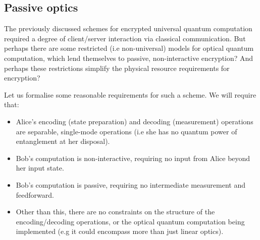 \documentclass[aps, rmp, twocolumn, amsmath, amssymb, nofootinbib, superscriptaddress, longbibliography, floatfix, table-of-contents, eqsecnum]{revtex4-1}
\begin{document}
\subsection{Passive optics} 

The previously discussed schemes for encrypted universal quantum computation required a degree of client/server interaction via classical communication. But perhaps there are some restricted (i.e non-universal) models for optical quantum computation, which lend themselves to passive, non-interactive encryption? And perhaps these restrictions simplify the physical resource requirements for encryption?

Let us formalise some reasonable requirements for such a scheme. We will require that:
\begin{itemize}
\item Alice's encoding (state preparation) and decoding (measurement) operations are separable, single-mode operations (i.e she has no quantum power of entanglement at her disposal).
\item Bob's computation is non-interactive, requiring no input from Alice beyond her input state.
\item Bob's computation is passive, requiring no intermediate measurement and feedforward.
\item Other than this, there are no constraints on the structure of the encoding/decoding operations, or the optical quantum computation being implemented (e.g it could encompass more than just linear optics).
\end{itemize}
\end{document}
